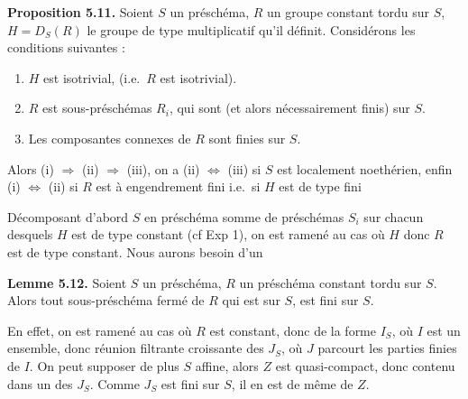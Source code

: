 \documentclass[11pt,a4paper]{article}
\begin{document}
\textbf{Proposition 5.11.} Soient $S$ un préschéma, $R$ un groupe constant
tordu sur $S$, $H = D_S(R)$ le groupe de type multiplicatif qu'il définit.
Considérons les conditions suivantes :
\begin{enumerate}
\item[(i)] $H$ est isotrivial, (i.e.\ $R$ est isotrivial).
\item[(ii)] $R$ est  
sous-préschémas $R_i$, qui sont 
 (et alors nécessairement finis) sur $S$.
\item[(iii)] Les composantes connexes de $R$ sont finies sur $S$.
\end{enumerate}
Alors (i) $\Longrightarrow$ (ii) $\Longrightarrow$ (iii), on a  (ii) $\Longleftrightarrow$ (iii) si $S$ est
localement noethérien, enfin (i) $\Longleftrightarrow$ (ii) si $R$ est
 à engendrement fini i.e.\ si $H$ est de type fini

Décomposant d'abord $S$ en préschéma somme de préschémas $S_i$ sur chacun
desquels $H$ est de type constant (cf Exp  1), on est ramené au
cas où $H$  donc $R$ est de type constant. Nous aurons
besoin \struck{\ill{}} d'un


\textbf{Lemme 5.12.} Soient $S$ un préschéma, $R$ un préschéma constant tordu
sur $S$. Alors tout sous-préschéma fermé \struck{\ill{}}  de $R$
qui est   sur $S$, est fini sur $S$.

En effet, on est ramené au cas où $R$ est constant, donc de la forme $I_S$,
où $I$ est un ensemble, donc réunion filtrante croissante des $J_S$, où $J$
parcourt les parties finies de $I$. On peut supposer de plus $S$ affine,
alors \struck{\ill{}} $Z$ est quasi-compact, donc contenu dans un des $J_S$.
Comme $J_S$ est fini sur $S$, il en est de même de $Z$.
\end{document}
